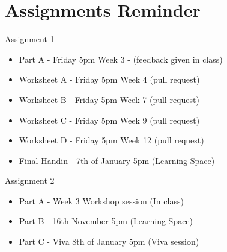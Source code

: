 \part{Assignments Reminder}
\frame{\partpage}

\begin{frame}{Assignment 1}
	\begin{itemize}
		\item Part A - Friday 5pm Week 3 - (feedback given in class)
		\item Worksheet A - Friday 5pm Week 4 (pull request)
		\item Worksheet B - Friday 5pm Week 7 (pull request)
		\item Worksheet C - Friday 5pm Week 9 (pull request)
		\item Worksheet D - Friday 5pm Week 12 (pull request)
		\item Final Handin - 7th of January 5pm (Learning Space)
	\end{itemize}
\end{frame}

\begin{frame}{Assignment 2}
\begin{itemize}
	\item Part A - Week 3 Workshop session (In class)
	\item Part B - 16th November 5pm (Learning Space)
	\item Part C - Viva 8th of January 5pm (Viva session)
\end{itemize}
\end{frame}